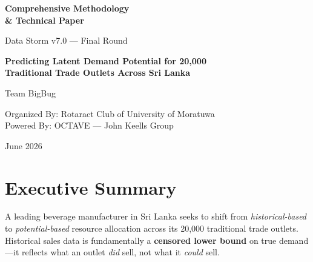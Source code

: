 \documentclass[10.75pt, a4paper]{article}
\begin{document}
\begin{titlepage}
\centering
\vspace*{3cm}

{\Huge\bfseries\color{bigbugblue} Comprehensive Methodology\\[0.3cm] \& Technical Paper}

\vspace{1cm}

{\Large\textcolor{accentgold}{Data Storm v7.0 --- Final Round}}

\vspace{1.5cm}

{\large\textbf{Predicting Latent Demand Potential for 20,000\\Traditional Trade Outlets Across Sri Lanka}}

\vspace{2cm}

{\Large Team BigBug}

\vspace{0.5cm}

{\normalsize Organized By: Rotaract Club of University of Moratuwa\\
Powered By: OCTAVE --- John Keells Group}

\vspace{3cm}

{\large June 2026}
\end{titlepage}

\tableofcontents
\newpage

\section{Executive Summary}

A leading beverage manufacturer in Sri Lanka seeks to shift from \textit{historical-based} to \textit{potential-based} resource allocation across its 20,000 traditional trade outlets. Historical sales data is fundamentally a \textbf{censored lower bound} on true demand---it reflects what an outlet \textit{did} sell, not what it \textit{could} sell.
\end{document}
